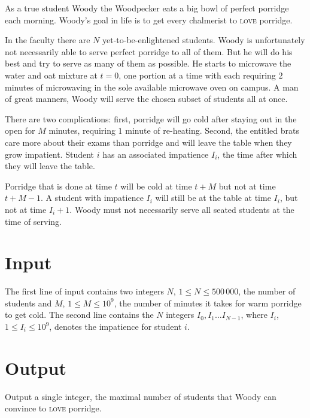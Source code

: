 As a true student Woody the Woodpecker eats a big bowl of perfect porridge each morning. Woody’s goal in life is to get every chalmerist to \textsc{love} porridge.

In the faculty there are $N$ yet-to-be-enlightened students. Woody is unfortunately not necessarily able to serve perfect porridge to all of them. But he will do his best and try to serve as many of them as possible. He starts to microwave the water and oat mixture at $t=0$, one portion at a time with each requiring $2$ minutes of microwaving in the sole available microwave oven on campus. A man of great manners, Woody will serve the chosen subset of students all at once.

There are two complications: first, porridge will go cold after staying out in the open for $M$ minutes, requiring $1$ minute of re-heating. Second, the entitled brats care more about their exams than porridge and will leave the table when they grow impatient. Student $i$ has an associated impatience $I_i$, the time after which they will leave the table.

Porridge that is done at time $t$ will be cold at time $t+M$ but not at time $t+M-1$. A student with impatience $I_i$ will still be at the table at time $I_i$, but not at time $I_i+1$. Woody must not necessarily serve all seated students at the time of serving.

\section*{Input}
The first line of input contains two integers $N$, $1 \leq N \leq 500\,000$, the number of students and $M$, $1 \leq M \leq 10^9$, the number of minutes it takes for warm porridge to get cold. The second line contains the $N$ integers $I_0, I_1 \ldots I_{N-1}$, where $I_i$, $1 \leq I_i \leq 10^9$, denotes the impatience for student $i$.


\section*{Output}
Output a single integer, the maximal number of students that Woody can convince to \textsc{love} porridge.
